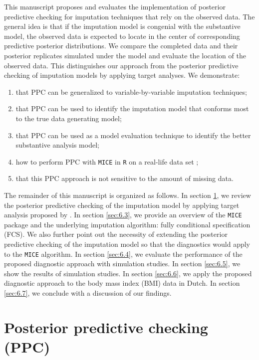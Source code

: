 	This manuscript proposes and evaluates the implementation of posterior predictive checking for imputation techniques that rely on the observed data. The general idea is that if the imputation model is congenial with the substantive model, the observed data is expected to locate in the center of corresponding predictive posterior distributions. We compare the completed data and their posterior replicates simulated under the model and evaluate the location of the observed data. This distinguishes our approach from the posterior predictive checking of imputation models by applying target analyses. We demonstrate:
	\begin{enumerate}
		\item that PPC can be generalized to variable-by-variable imputation techniques; 
		\item that PPC can be used to identify the imputation model that conforms most to the true data generating model;
		\item that PPC can be used as a model evaluation technique to identify the better substantive analysis model;
		\item how to perform PPC with \texttt{MICE} in \texttt{R} on a real-life data set \citep{Buuren2011};
		\item that this PPC approach is not sensitive to the amount of missing data.
	\end{enumerate}
	The remainder of this manuscript is organized as follows. In section \ref{sec:6.2}, we review the posterior predictive checking of the imputation model by applying target analysis proposed by \citet{he2012diagnosing}. In section \ref{sec:6.3}, we provide an overview of the \texttt{MICE} package and the underlying imputation algorithm: fully conditional specification (FCS). We also further point out the necessity of extending the posterior predictive checking of the imputation model so that the diagnostics would apply to the \texttt{MICE} algorithm. In section \ref{sec:6.4}, we evaluate the performance of the proposed diagnostic approach with simulation studies. In section \ref{sec:6.5}, we show the results of simulation studies. In section \ref{sec:6.6}, we apply the proposed diagnostic approach to the body mass index (BMI) data in Dutch. In section \ref{sec:6.7}, we conclude with a discussion of our findings.  
	
	\section{Posterior predictive checking (PPC)}
	\label{sec:6.2}
